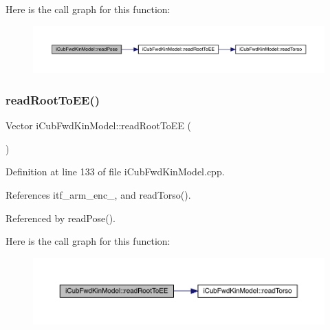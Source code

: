 Here is the call graph for this function\+:
\nopagebreak
\begin{figure}[H]
\begin{center}
\leavevmode
\includegraphics[width=350pt]{classiCubFwdKinModel_ad549519048e9b54c18af51c6b173b726_cgraph}
\end{center}
\end{figure}
\mbox{\label{classiCubFwdKinModel_a638ea7ef68d98f306346684c93934a93}} 
\subsubsection{\texorpdfstring{read\+Root\+To\+E\+E()}{readRootToEE()}}
{\footnotesize\ttfamily Vector i\+Cub\+Fwd\+Kin\+Model\+::read\+Root\+To\+EE (\begin{DoxyParamCaption}{ }\end{DoxyParamCaption})\hspace{0.3cm}{\ttfamily [protected]}}



Definition at line 133 of file i\+Cub\+Fwd\+Kin\+Model.\+cpp.



References itf\+\_\+arm\+\_\+enc\+\_\+, and read\+Torso().



Referenced by read\+Pose().

Here is the call graph for this function\+:
\nopagebreak
\begin{figure}[H]
\begin{center}
\leavevmode
\includegraphics[width=350pt]{classiCubFwdKinModel_a638ea7ef68d98f306346684c93934a93_cgraph}
\end{center}
\end{figure}
\mbox{\label{classiCubFwdKinModel_a4ed6df084a996223a740a7065e16b799}} 
